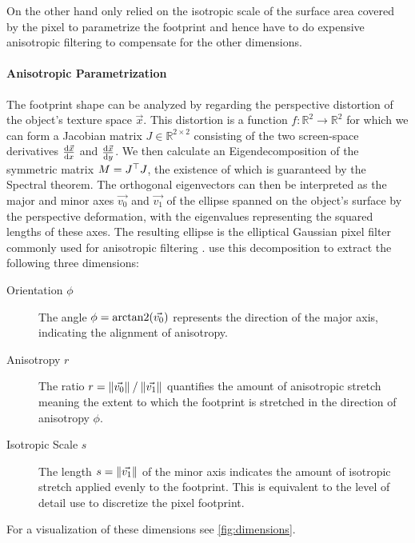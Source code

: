 On the other hand \textcite{zirr2016} only relied on the isotropic scale of the surface area covered by the pixel to parametrize the footprint and hence have to do expensive anisotropic filtering to compensate for the other dimensions.

\paragraph{Anisotropic Parametrization}
%
The footprint shape can be analyzed by regarding the perspective distortion of the object's texture space $\vec{x}$.
%
This distortion is a function $f: \mathbb{R}^2 \to \mathbb{R}^2$ for which we can form a Jacobian matrix $J \in \mathbb{R}^{2 \times 2}$ consisting of the two screen-space derivatives $\frac{\mathrm{d}\vec{x}}{\mathrm{d}x}$ and $\frac{\mathrm{d}\vec{x}}{\mathrm{d}y}$.
%
We then calculate an Eigendecomposition of the symmetric matrix $M=J^\top J$, the existence of which is guaranteed by the Spectral theorem.
%
The orthogonal eigenvectors can then be interpreted as the major and minor axes $\vec{v_0}$ and $\vec{v_1}$ of the ellipse spanned on the object's surface by the perspective deformation, with the eigenvalues representing the squared lengths of these axes.
%
The resulting ellipse is the elliptical Gaussian pixel filter commonly used for anisotropic filtering \parencite[see][]{heckbert1989}.
%
\textcite{deliot2023} use this decomposition to extract the following three dimensions:
%
\begin{description}
    \item[Orientation $\phi$\label{dim:phi}]
    The angle $\phi=\arctantwo{\vec{v_0}}$ represents the direction of the major axis, indicating the alignment of anisotropy.

    \item[Anisotropy $r$\label{dim:aniso}]
    The ratio $r=\flatfrac{\norm{\vec{v_0}}}{\norm{\vec{v_1}}}$ quantifies the amount of anisotropic stretch meaning the extent to which the footprint is stretched in the direction of anisotropy $\phi$.
    
    \item[Isotropic Scale $s$\label{dim:scale}]
    The length $s=\norm{\vec{v_1}}$ of the minor axis indicates the amount of isotropic stretch applied evenly to the footprint.
    This is equivalent to the level of detail \textcite{zirr2016} use to discretize the pixel footprint.
\end{description}
%
For a visualization of these dimensions see \cref{fig:dimensions}.


